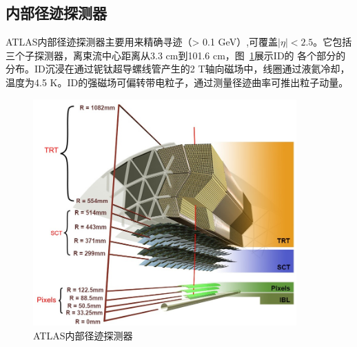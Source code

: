 \subsection{内部径迹探测器}
ATLAS内部径迹探测器主要用来精确寻迹（\pt > 0.1 GeV）,可覆盖$|\eta|<2.5$。它包括三个子探测器，离束流中心距离从3.3 cm到101.6 cm，图~\ref{fig:ATLAS_ID_sideview}展示ID的
各个部分的分布。ID沉浸在通过铌钛超导螺线管产生的2 T轴向磁场中，线圈通过液氦冷却，温度为4.5 K。ID的强磁场可偏转带电粒子，通过测量径迹曲率可推出粒子动量。
\begin{figure}[h]
\begin{center}
\includegraphics[width=0.9\textwidth]{fig/ATLAS_ID_sideview.png}
\caption{ATLAS内部径迹探测器} \label{fig:ATLAS_ID_sideview}
\end{center}
\end{figure}


